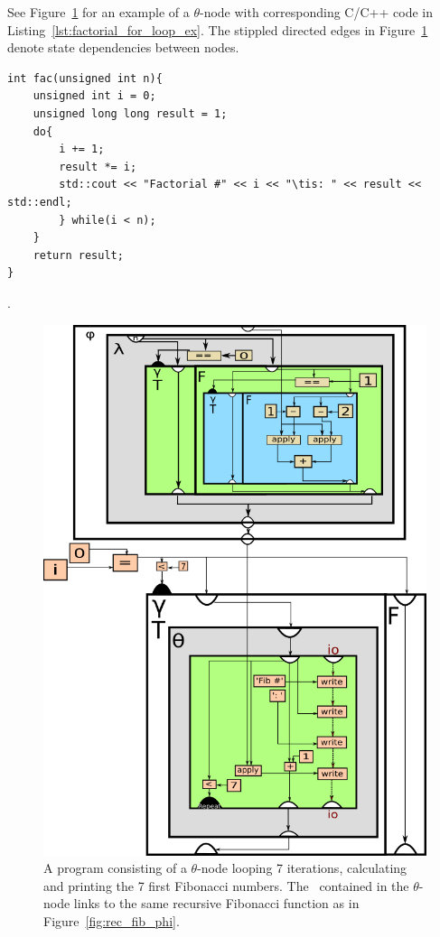 \begin{itemize}
See Figure~\ref{fig:factorial_for_loop_ex} for an example of a $\theta$-node
with corresponding C/C++ code in Listing~\ref{lst:factorial_for_loop_ex}.
The stippled directed edges in Figure~\ref{fig:factorial_for_loop_ex} denote
state dependencies between nodes.

\begin{lstlisting}[label={lst:factorial_for_loop_ex}, style=customcpp,
caption={C/C++ code corresponding to the RVSDG subgraph in
Figure~\ref{fig:factorial_for_loop_ex}.}]
int fac(unsigned int n){
	unsigned int i = 0;
	unsigned long long result = 1;
	do{
		i += 1;
		result *= i;
		std::cout << "Factorial #" << i << "\tis: " << result << std::endl;
		} while(i < n);
	}
	return result;
}
\end{lstlisting}
\vspace{-4\parskip} %
.
\newpage

\begin{figure}[ht!]
	\centering
	\includegraphics[width=\textwidth]{figures/for-loop-printf-rec_fib-example}
	\caption{A program consisting of a $\theta$-node looping 7 iterations,
calculating and printing the 7 first Fibonacci numbers. The \applyNode ~contained
in the $\theta$-node links to the same recursive Fibonacci function as in
Figure~\ref{fig:rec_fib_phi}.}
	\label{fig:factorial_for_loop_ex}
\end{figure}


\end{itemize}
